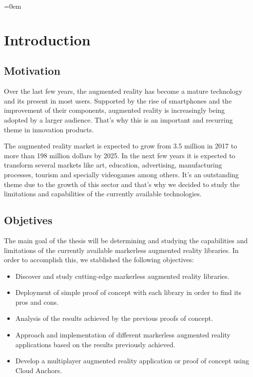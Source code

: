\parindent=0em
\chapter*{Introduction}
\noindent
\section*{Motivation}
Over the last few years, the augmented reality has become a mature technology and its present in most users. Supported by the rise of smartphones and the improvement of their components, augmented reality is increasingly being adopted by a larger audience. That’s why this is an important and recurring theme in innovation products.

The augmented reality market is expected to grow from 3.5 million in 2017 to more than 198 million dollars by 2025. In the next few years it is expected to transform several markets like art, education, advertising, manufacturing processes, tourism and specially videogames among others. It’s an outstanding theme due to the growth of this sector and that’s why we decided to study the limitations and capabilities of the currently available technologies.


\section*{Objetives}
The main goal of the thesis will be determining and studying the capabilities and limitations of the currently available markerless augmented reality libraries. In order to accomplish this, we stablished the following objectives:

\begin{itemize}
\item Discover and study cutting-edge markerless augmented reality libraries.
\item Deployment of simple proof of concept with each library in order to find its pros and cons.
\item Analysis of the results achieved by the previous proofs of concept.
\item Approach and implementation of different markerless augmented reality applications based on the results previously achieved.
\item Develop a multiplayer augmented reality application or proof of concept using Cloud Anchors.
\end{itemize}



